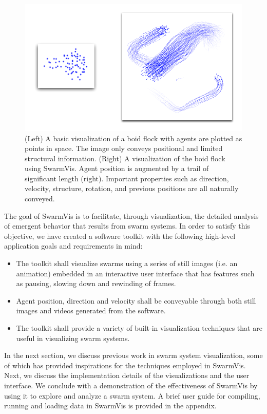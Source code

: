 \documentclass[conference]{IEEEtran}
\begin{document}
\begin{figure}[ht]
\centering
\includegraphics[scale=.59]{images/intro.pdf}
\caption{(Left) A basic visualization of a boid flock with agents are plotted as
points in space. The image only conveys positional and limited structural information.
(Right) A visualization of the boid flock using SwarmVis. Agent
position is augmented by a trail of significant length (right).
Important properties such as direction, velocity, structure, rotation,
and previous positions are all naturally conveyed.
}
\label{Intro}
\end{figure}

The goal of SwarmVis is to facilitate, through visualization, the detailed analysis of emergent behavior that results from swarm systems.
In order to satisfy this objective, we have created a software toolkit
with the following high-level application goals and requirements in mind:
\begin{itemize}
\item The toolkit shall visualize swarms using a series of still images (i.e. an animation)
embedded in an interactive user interface that has features such as pausing, slowing down and rewinding of frames.
\item Agent position, direction and velocity shall be conveyable through both still images and videos generated from the software.
\item The toolkit shall provide a variety of built-in visualization techniques that are useful in visualizing swarm systems.
\end{itemize}

In the next section, we discuss previous work in swarm system visualization,
some of which has provided inspirations for the techniques employed in SwarmVis.
Next, we discuss the implementation details of the visualizations and the user interface.
We conclude with a demonstration of the effectiveness of SwarmVis by using it to explore and analyze a swarm system.
A brief user guide for compiling, running and loading data in SwarmVis is provided in the appendix.
\end{document}
